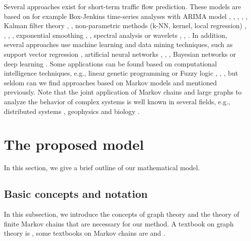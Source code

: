\documentclass[b5paper,12pt]{report}
\theoremstyle{definition}
\begin{document}
Several approaches exist for short-term traffic flow prediction. These models are based on for example Box-Jenkins time-series analyses with ARIMA model \cite{van1996combining}, \cite{lee1999application}, \cite{stathopoulos2003multivariate}, \cite{ghosh2009multivariate}, \cite{xue2008short}, Kalman filter theory \cite{wang2005real}, \cite{ngoduy2011low}, non-parametric methods (k-NN, kernel, local regression) \cite{davis1991nonparametric}, \cite{smith2002comparison}, \cite{turochy2004relating}, \cite{smith1997traffic}, exponential smoothing \cite{messer1993advanced}, \cite{castro2009online}, spectral analysis \cite{nicholson1974prediction} or wavelets \cite{jiang2005dynamic}, \cite{xie2006wavelet}, \cite{cheng2007mining}. In addition, several approaches use machine learning and data mining techniques, such as support vector regression \cite{jeong2013supervised}, artificial neural networks \cite{chan2012neural}, \cite{park1998short}, \cite{dia2001object}, Bayesian networks \cite{sun2006bayesian} or deep learning \cite{lv2015traffic}. Some applications can be found based on computational intelligence techniques, e.g., linear genetic programming \cite{brameier2007basic} or Fuzzy logic \cite{iokibe1993traffic}, \cite{li2006type}, \cite{zhang2008short}, but seldom can we find approaches based on Markov models \cite{necula2014dynamic} and \cite{Crisostomietal2011} mentioned previously. Note that the joint application of Markov chains and large graphs to analyze the behavior of complex systems is well known in several fields, e.g., distributed systems \cite{dabrowski2011hunt}, geophysics \cite{Cavers2015Vasudevan} and biology \cite{Lesne2006}.

\section{The proposed model}
\label{model-desc}

In this section, we give a brief outline of our mathematical model.

\subsection{Basic concepts and notation}
\label{model-basics}

In this subsection, we introduce the concepts of graph theory and the theory of finite Markov chains that are necessary for our method. A textbook on graph theory is \cite{JensenGutin2007}, some textbooks on Markov chains are \cite{Asmussen2003} and \cite{Bremaud1999}.
\end{document}
